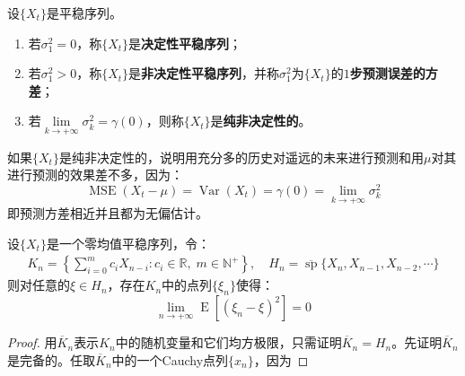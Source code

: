 \begin{definition}
	设$\{X_t\}$是平稳序列。
	\begin{enumerate}
		\item 若$\sigma_1^2=0$，称$\{X_t\}$是\textbf{决定性平稳序列}；
		\item 若$\sigma_1^2>0$，称$\{X_t\}$是\textbf{非决定性平稳序列}，并称$\sigma_1^2$为$\{X_t\}$的\textbf{$1$步预测误差的方差}；
		\item 若$\lim\limits_{k\to+\infty}\sigma_k^2=\gamma(0)$，则称$\{X_t\}$是\textbf{纯非决定性的}。
	\end{enumerate}
\end{definition}
\begin{note}
	如果$\{X_t\}$是纯非决定性的，说明用充分多的历史对遥远的未来进行预测和用$\mu$对其进行预测的效果差不多，因为：
	\begin{equation*}
		\operatorname{MSE}(X_t-\mu)=\operatorname{Var}(X_t)=\gamma(0)=\lim_{k\to+\infty}\sigma_k^2
	\end{equation*}
	即预测方差相近并且都为无偏估计。
\end{note}

\begin{lemma}
	设$\{X_t\}$是一个零均值平稳序列，令：
	\begin{gather*}
		K_n=\left\{\sum_{i=0}^{m}c_iX_{n-i}:c_i\in\mathbb{R},\;m\in\mathbb{N}^+\right\},\quad
		H_n=\overline{\operatorname{sp}}\{X_n,X_{n-1},X_{n-2},\cdots\}
	\end{gather*}
	则对任意的$\xi\in H_n$，存在$K_n$中的点列$\{\xi_n\}$使得：
	\begin{equation*}
		\lim_{n\to+\infty}\operatorname{E}[(\xi_n-\xi)^2]=0
	\end{equation*}
\end{lemma}
\begin{proof}
	用$\overline{K}_n$表示$K_n$中的随机变量和它们均方极限，只需证明$\overline{K}_n=H_n$。先证明$\overline{K}_n$是完备的。任取$\overline{K}_n$中的一个Cauchy点列$\{x_n\}$，因为
\end{proof}
